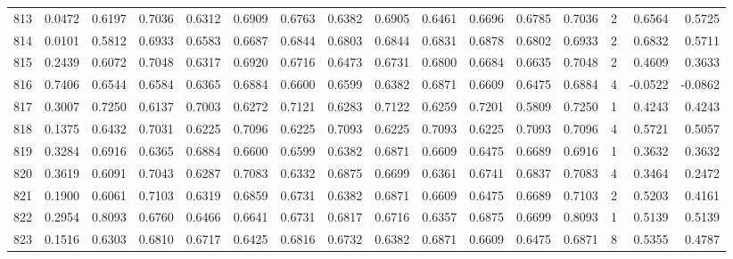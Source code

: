 \begin{tabular}{lrrrrrrrrrrrrrrr}
813 &      0.0472 &  0.6197 &  0.7036 &  0.6312 &  0.6909 &  0.6763 &  0.6382 &  0.6905 &  0.6461 &  0.6696 &   0.6785 &     0.7036 &      2 &                    0.6564 &                     0.5725 \\
814 &      0.0101 &  0.5812 &  0.6933 &  0.6583 &  0.6687 &  0.6844 &  0.6803 &  0.6844 &  0.6831 &  0.6878 &   0.6802 &     0.6933 &      2 &                    0.6832 &                     0.5711 \\
815 &      0.2439 &  0.6072 &  0.7048 &  0.6317 &  0.6920 &  0.6716 &  0.6473 &  0.6731 &  0.6800 &  0.6684 &   0.6635 &     0.7048 &      2 &                    0.4609 &                     0.3633 \\
816 &      0.7406 &  0.6544 &  0.6584 &  0.6365 &  0.6884 &  0.6600 &  0.6599 &  0.6382 &  0.6871 &  0.6609 &   0.6475 &     0.6884 &      4 &                   -0.0522 &                    -0.0862 \\
817 &      0.3007 &  0.7250 &  0.6137 &  0.7003 &  0.6272 &  0.7121 &  0.6283 &  0.7122 &  0.6259 &  0.7201 &   0.5809 &     0.7250 &      1 &                    0.4243 &                     0.4243 \\
818 &      0.1375 &  0.6432 &  0.7031 &  0.6225 &  0.7096 &  0.6225 &  0.7093 &  0.6225 &  0.7093 &  0.6225 &   0.7093 &     0.7096 &      4 &                    0.5721 &                     0.5057 \\
819 &      0.3284 &  0.6916 &  0.6365 &  0.6884 &  0.6600 &  0.6599 &  0.6382 &  0.6871 &  0.6609 &  0.6475 &   0.6689 &     0.6916 &      1 &                    0.3632 &                     0.3632 \\
820 &      0.3619 &  0.6091 &  0.7043 &  0.6287 &  0.7083 &  0.6332 &  0.6875 &  0.6699 &  0.6361 &  0.6741 &   0.6837 &     0.7083 &      4 &                    0.3464 &                     0.2472 \\
821 &      0.1900 &  0.6061 &  0.7103 &  0.6319 &  0.6859 &  0.6731 &  0.6382 &  0.6871 &  0.6609 &  0.6475 &   0.6689 &     0.7103 &      2 &                    0.5203 &                     0.4161 \\
822 &      0.2954 &  0.8093 &  0.6760 &  0.6466 &  0.6641 &  0.6731 &  0.6817 &  0.6716 &  0.6357 &  0.6875 &   0.6699 &     0.8093 &      1 &                    0.5139 &                     0.5139 \\
823 &      0.1516 &  0.6303 &  0.6810 &  0.6717 &  0.6425 &  0.6816 &  0.6732 &  0.6382 &  0.6871 &  0.6609 &   0.6475 &     0.6871 &      8 &                    0.5355 &                     0.4787 \\

\end{tabular}
